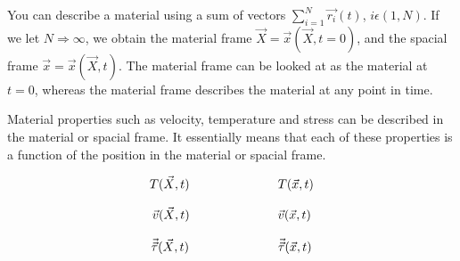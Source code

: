 \documentclass{article}
\begin{document}
You can describe a material using a sum of vectors \begin{math} \sum_{i=1}^{N} \vec{r_{i}}(t) \end{math}, \begin{math} i \epsilon (1,N) \end{math}. If we let \begin{math} N \Rightarrow \infty \end{math}, we obtain the material frame \begin{math} \vec{X} = \vec{x}(\vec{X} , t = 0 ) \end{math}, and the spacial frame \begin{math} \vec{x} = \vec{x}(\vec{X} , t ) \end{math}. The material frame can be looked at as the material at \begin{math} t = 0 \end{math}, whereas the material frame describes the material at any point in time.

Material properties such as velocity, temperature and stress can be described in the material or spacial frame. It essentially means that each of these properties is a function of the position in the material or spacial frame. 

\begin{equation} \label{eq:1}
T(\vec{X}, t) \hspace{0.125cm} \hspace{1.125cm} \hspace{1.125cm} \hspace{0.125cm}  T(\vec{x}, t)
\end{equation}

\begin{equation} \label{eq:1}
\vec{v}(\vec{X}, t) \hspace{0.125cm} \hspace{1.125cm} \hspace{1.125cm} \hspace{0.125cm}  \vec{v}(\vec{x}, t)
\end{equation}

\begin{equation} \label{eq:1}
\vec{\vec{\tau}}(\vec{X}, t) \hspace{0.125cm} \hspace{1.125cm} \hspace{1.125cm} \hspace{0.125cm}  \vec{\vec{\tau}}(\vec{x}, t)
\end{equation}
\end{document}
